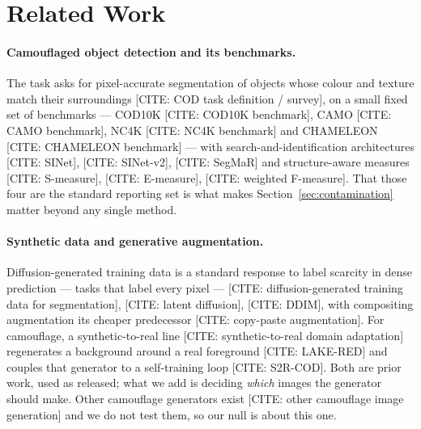 \documentclass{article} %
\begin{document}
\section{Related Work}
\label{sec:related}

\paragraph{Camouflaged object detection and its benchmarks.} The task asks for pixel-accurate
segmentation of objects whose colour and texture match their surroundings
[CITE: COD task definition / survey], on a small fixed set of benchmarks --- COD10K
[CITE: COD10K benchmark], CAMO [CITE: CAMO benchmark], NC4K [CITE: NC4K benchmark] and CHAMELEON
[CITE: CHAMELEON benchmark] --- with search-and-identification architectures [CITE: SINet],
[CITE: SINet-v2], [CITE: SegMaR] and structure-aware measures [CITE: S-measure], [CITE: E-measure],
[CITE: weighted F-measure]. That those four are the standard reporting set is what makes
Section~\ref{sec:contamination} matter beyond any single method.

\paragraph{Synthetic data and generative augmentation.} Diffusion-generated training data is a
standard response to label scarcity in dense prediction --- tasks that label every pixel ---
[CITE: diffusion-generated training data for segmentation], [CITE: latent diffusion], [CITE: DDIM],
with compositing augmentation its cheaper predecessor [CITE: copy-paste augmentation]. For
camouflage, a synthetic-to-real line [CITE: synthetic-to-real domain adaptation] regenerates a
background around a real foreground [CITE: LAKE-RED] and couples that generator to a self-training
loop [CITE: S2R-COD]. Both are prior work, used as released; what we add is deciding \emph{which} images the generator
should make. Other camouflage generators exist [CITE: other camouflage image generation] and we do
not test them, so our null is about this one.
\end{document}
